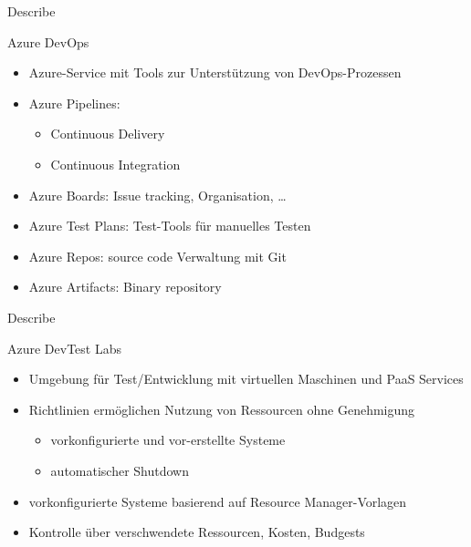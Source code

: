 \documentclass{scrartcl}
\newenvironment{flashcard}[2][]{%
    #1
    \vfill
    \centerline{\Large{#2}}
    \vfill
\newpage
}
{\newpage}
\begin{document}
    \begin{flashcard}[Describe]{Azure DevOps}
        \begin{itemize}
            \item Azure-Service mit Tools zur Unterstützung von DevOps-Prozessen
            \item Azure Pipelines:
            \begin{itemize}
                \item Continuous Delivery
                \item Continuous Integration
            \end{itemize}
            \item Azure Boards: Issue tracking, Organisation, \ldots
            \item Azure Test Plans: Test-Tools für manuelles Testen
            \item Azure Repos: source code Verwaltung mit Git
            \item Azure Artifacts: Binary repository
        \end{itemize}

    \end{flashcard}

    \begin{flashcard}[Describe]{Azure DevTest Labs}
        \begin{itemize}
            \item Umgebung für Test/Entwicklung mit virtuellen Maschinen und PaaS Services
            \item Richtlinien ermöglichen Nutzung von Ressourcen ohne Genehmigung
            \begin{itemize}
                \item vorkonfigurierte und vor-erstellte Systeme
                \item automatischer Shutdown
            \end{itemize}
            \item vorkonfigurierte Systeme basierend auf Resource Manager-Vorlagen
            \item Kontrolle über verschwendete Ressourcen, Kosten, Budgests
        \end{itemize}
    \end{flashcard}
\end{document}
